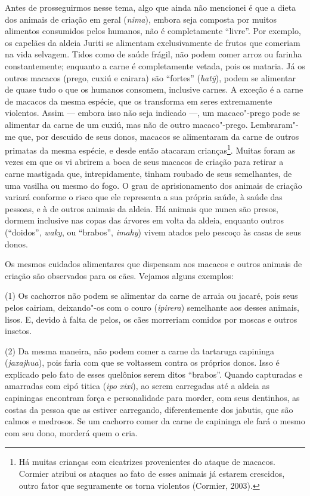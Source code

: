 Antes de prosseguirmos nesse tema, algo que ainda não mencionei é que a
dieta dos animais de criação em geral (\emph{nima}), embora seja
composta por muitos alimentos consumidos pelos humanos, não é
completamente ``livre''. Por exemplo, os capelães da aldeia Juriti se
alimentam exclusivamente de frutos que comeriam na vida selvagem. Tidos
como de saúde frágil, não podem comer arroz ou farinha constantemente;
enquanto a carne é completamente vetada, pois os mataria. Já os outros
macacos (prego, cuxiú e cairara) são ``fortes'' (\emph{hatỹ}), podem se
alimentar de quase tudo o que os humanos consomem, inclusive carnes. A
exceção é a carne de macacos da mesma espécie, que os transforma em
seres extremamente violentos. Assim --- embora isso não seja indicado ---,
um macaco"-prego pode se alimentar da carne de um cuxiú, mas não de outro
macaco"-prego. Lembraram"-me que, por descuido de seus donos, macacos se
alimentaram da carne de outros primatas da mesma espécie, e desde então
atacaram crianças\footnote{Há muitas crianças com cicatrizes
  provenientes do ataque de macacos. Cormier atribui os ataques ao fato
  de esses animais já estarem crescidos, outro fator que seguramente os
  torna violentos (Cormier, 2003).}. Muitas foram as vezes em que os vi
abrirem a boca de seus macacos de criação para retirar a carne mastigada
que, intrepidamente, tinham roubado de seus semelhantes, de uma vasilha
ou mesmo do fogo. O grau de aprisionamento dos animais de criação
variará conforme o risco que ele representa a sua própria saúde, à saúde
das pessoas, e à de outros animais da aldeia. Há animais que nunca são
presos, dormem inclusive nas copas das árvores em volta da aldeia,
enquanto outros (``doidos'', \emph{waky}, ou ``brabos'', \emph{imahy}) vivem
atados pelo pescoço às casas de seus donos.

Os mesmos cuidados alimentares que dispensam aos macacos e outros
animais de criação são observados para os cães. Vejamos alguns exemplos:

(1) Os cachorros não podem se alimentar da carne de arraia ou jacaré,
pois seus pelos cairiam, deixando"-os com o couro (\emph{ipirera})
semelhante aos desses animais, lisos. E, devido à falta de pelos, os
cães morreriam comidos por moscas e outros insetos.

(2) Da mesma maneira, não podem comer a carne da tartaruga capininga
(\emph{jaxajhua}), pois faria com que se voltassem contra os próprios
donos. Isso é explicado pelo fato de esses quelônios serem ditos
``brabos''. Quando capturadas e amarradas com cipó titica (\emph{ipo}
\emph{xixi}), ao serem carregadas até a aldeia as capiningas encontram
força e personalidade para morder, com seus dentinhos, as costas da
pessoa que as estiver carregando, diferentemente dos jabutis, que são
calmos e medrosos. Se um cachorro comer da carne de capininga ele fará o
mesmo com seu dono, morderá quem o cria.

